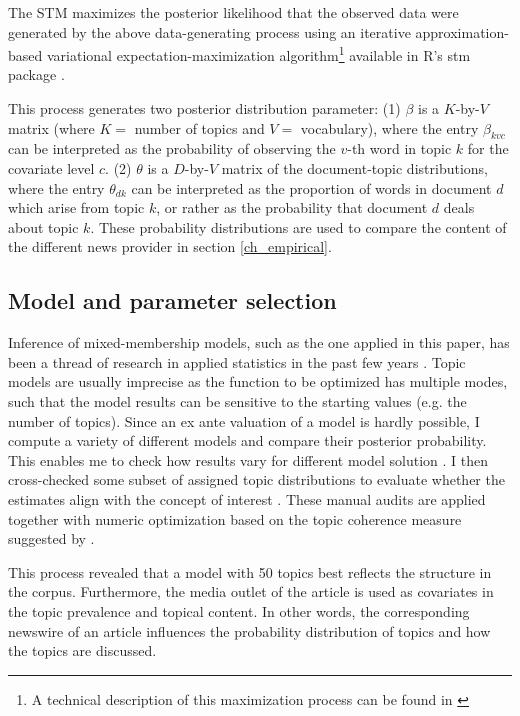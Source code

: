 \documentclass[12pt,a4paper,notitlepage]{article}
\begin{document}
The STM maximizes the posterior likelihood that the observed data were generated by the above data-generating process using an iterative approximation-based variational expectation-maximization algorithm\footnote{A technical description of this maximization process can be found in \citet{roberts_model_2016}} available in R's stm package \citep{roberts_stm:_2016}. 

This process generates two posterior distribution parameter: (1) $\beta$ is a $K$-by-$V$ matrix (where $K=$ number of topics and $V=$ vocabulary), where the entry $\beta_{kvc}$ can be interpreted as the probability of observing the $v$-th word in topic $k$ for the covariate level $c$. (2) $\theta$ is a $D$-by-$V$ matrix of the document-topic distributions, where the entry $\theta_{dk}$ can be interpreted as the proportion of words in document $d$ which arise from topic $k$, or rather as the probability that document $d$ deals about topic $k$. These probability distributions are used to compare the content of the different news provider in section \ref{ch_empirical}.


\subsection{Model and parameter selection}

Inference of mixed-membership models, such as the one applied in this paper, has been a thread of research in applied statistics in the past few years \citep{blei_latent_2003} \citep{erosheva_mixed-membership_2004} \citep{braun_variational_2010}. Topic models are usually imprecise as the function to be optimized has multiple modes, such that the model results can be sensitive to the starting values (e.g. the number of topics). Since an ex ante valuation of a model is hardly possible, I compute a variety of different models and compare their posterior probability. This enables me to check how results vary for different model solution \citep{roberts_navigating_2016}. I then cross-checked some subset of assigned topic distributions to evaluate whether the estimates align with the concept of interest \citep{gentzkow_text_2017}. These manual audits are applied together with numeric optimization based on the topic coherence measure suggested by \citet{mimno_optimizing_2011}. 

This process revealed that a model with 50 topics best reflects the structure in the corpus. Furthermore, the media outlet of the article is used as covariates in the topic prevalence and topical content. In other words, the corresponding newswire of an article influences the probability distribution of topics and how the topics are discussed. 
\end{document}
